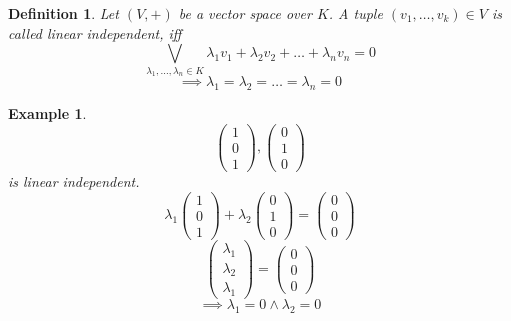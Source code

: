 \documentclass[a4paper,landscape,twocolumn]{article}
\newtheorem{defi}{Definition}[section]
\newtheorem{ex}{Example}[section]
\begin{document}
\begin{defi}
  Let $(V, +)$ be a vector space over $K$.
  A tuple $(v_1, \ldots, v_k) \in V$ is called linear independent, iff
  \[ \bigvee_{\lambda_1, \ldots, \lambda_n \in K} {\lambda}_1 v_1 + \lambda_2 v_2 + \ldots + \lambda_n v_n = 0 \]
  \[ \implies \lambda_1 = \lambda_2 = \ldots = \lambda_n = 0 \]
\end{defi}

\begin{ex}
  \[ \begin{pmatrix}1 \\ 0 \\ 1 \end{pmatrix}, \begin{pmatrix} 0 \\ 1 \\ 0 \end{pmatrix} \]
  is linear independent.
  \[ \lambda_1 \begin{pmatrix} 1 \\ 0 \\ 1 \end{pmatrix} + \lambda_2 \begin{pmatrix} 0 \\ 1 \\ 0 \end{pmatrix} = \begin{pmatrix} 0 \\ 0 \\ 0 \end{pmatrix} \]
  \[ \begin{pmatrix} \lambda_1 \\ \lambda_2 \\ \lambda_1 \end{pmatrix} = \begin{pmatrix} 0 \\ 0 \\ 0 \end{pmatrix} \]
  \[ \implies \lambda_1 = 0 \land \lambda_2 = 0 \]
\end{ex}
\end{document}
